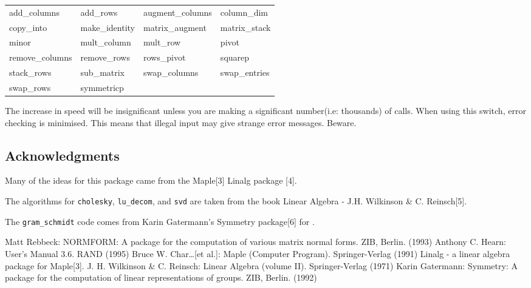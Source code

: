 \begin{tabular}{l l l l}
   add\_columns    & add\_rows      & augment\_columns & column\_dim  \\
   copy\_into      & make\_identity & matrix\_augment  & matrix\_stack\\
   minor           & mult\_column   &  mult\_row       & pivot        \\
   remove\_columns & remove\_rows   & rows\_pivot      & squarep      \\
   stack\_rows     & sub\_matrix    & swap\_columns    & swap\_entries\\
   swap\_rows      & symmetricp                                     
\end{tabular}

The increase in speed will be insignificant unless you are making a 
significant number(i.e: thousands) of calls. When using this switch, 
error checking is minimised. This means that illegal input may give
strange error messages. Beware.


\subsection{Acknowledgments}

Many of the ideas for this package came from the Maple[3] Linalg package
[4].

The algorithms for \texttt{cholesky}, \texttt{lu\_decom}, and \texttt{svd} are 
taken from the book Linear Algebra - J.H. Wilkinson \& C. Reinsch[5].

The \texttt{gram\_schmidt} code comes from Karin Gatermann's Symmetry 
package[6] for {\REDUCE}.


\begin{thebibliography}{9}
 Matt Rebbeck: NORMFORM: A {\REDUCE} package for the 
computation of various matrix normal forms. ZIB, Berlin. (1993)
 Anthony C. Hearn: {\REDUCE} User's Manual 3.6.
	RAND (1995)
 Bruce W. Char\ldots [et al.]: Maple (Computer 
        Program). Springer-Verlag (1991)
 Linalg - a linear algebra package for Maple[3].
 J. H. Wilkinson \& C. Reinsch: Linear Algebra 
(volume II). Springer-Verlag (1971)
 Karin Gatermann: Symmetry: A {\REDUCE} package for the 
computation of linear representations of groups. ZIB, Berlin. (1992)
\end{thebibliography}
